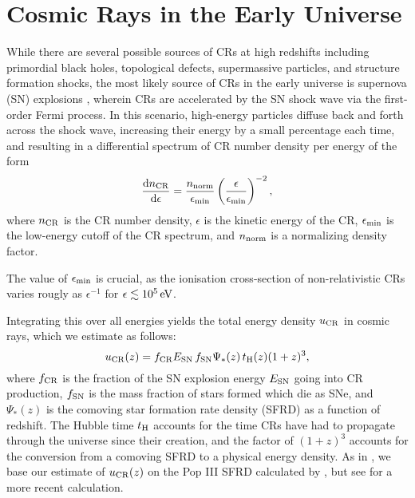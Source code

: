 \section{Cosmic Rays in the Early Universe}
\label{sec:context}
While there are several possible sources of CRs at high redshifts including primordial black holes, topological defects, supermassive particles, and structure formation shocks, the most likely source of CRs in the early universe is supernova (SN) explosions \citep[e.g.,][]{GinzburgSyrovatskii1969,BiermannSigl2001,Stanev2004,Pfrommeretal2006}, wherein CRs are accelerated by the SN shock wave via the first-order Fermi process.  In this scenario, high-energy particles diffuse back and forth across the shock wave, increasing their energy by a small percentage each time, and resulting in a differential spectrum of CR number density per energy \citep{Longair1994} of the form
\begin{equation}
    \frac{{\rm d}n_{\rm \small CR}}{{\rm d}\epsilon} = \frac{n_{\rm norm}}{\epsilon_{\rm min}}
    \left( \frac{\epsilon}{\epsilon_{\rm min}} \right)^{-2},
\end{equation}
where $n_{\rm \small CR}$ is the CR number density, $\epsilon$ is the kinetic energy of the CR, $\epsilon_{\rm min}$ is the low-energy cutoff of the CR spectrum, and $n_{\rm norm}$ is a normalizing density factor. 

The value of $\epsilon_{\rm min}$ is crucial, as the ionisation cross-section of non-relativistic CRs varies rougly as $\epsilon^{-1}$ for $\epsilon \lesssim 10^5\,{\rm eV}$.

Integrating this over all energies yields the total energy density $u_{\rm \small CR}$ in cosmic rays, which we estimate as follows:
\begin{equation}
u_{\rm \small CR}(z) = f_{\rm \small CR} E_{\rm \small SN}\, f_{\rm \small SN} \Psi_{*}(z)\, t_{\rm \small H}(z) (1+z)^3,
\end{equation}
where $f_{\rm \small CR}$ is the fraction of the SN explosion energy $E_{\rm \small SN}$ going into CR production, $f_{\rm \small SN}$ is the mass fraction of stars formed which die as SNe, and $\Psi_{*}(z)$ is the comoving star formation rate density (SFRD) as a function of redshift.  The Hubble time $t_{\rm \small H}$ accounts for the time CRs have had to propagate through the universe since their creation, and the factor of $(1+z)^3$ accounts for the conversion from a comoving SFRD to a physical energy density. As in \citet{Hummeletal2015}, we base our estimate of $u_{\rm \small CR}(z)$ on the Pop III SFRD calculated by \citet{GreifBromm2006}, but see \citet{Campisietal2011} for a more recent calculation.

